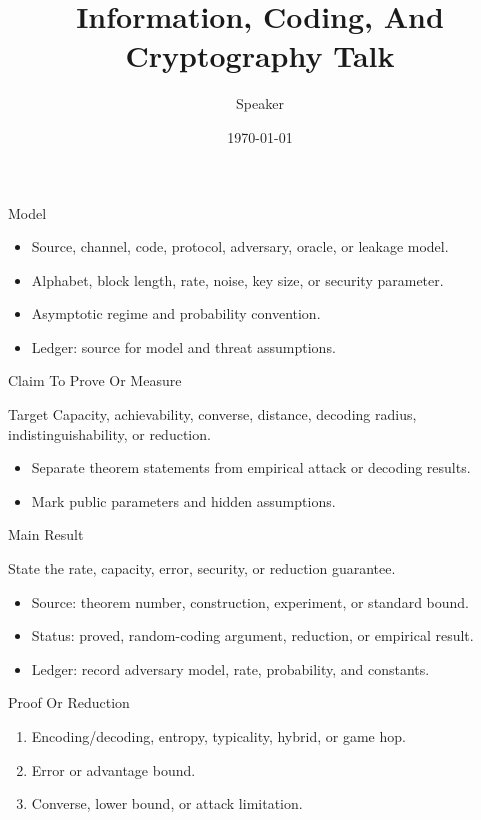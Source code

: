 \documentclass[10pt,aspectratio=169]{beamer}
\title{Information, Coding, And Cryptography Talk}
\author{Speaker}
\date{\today}
\begin{document}
\begin{frame}\titlepage\end{frame}

\begin{frame}{Model}
  \begin{itemize}
    \item Source, channel, code, protocol, adversary, oracle, or leakage model.
    \item Alphabet, block length, rate, noise, key size, or security parameter.
    \item Asymptotic regime and probability convention.
    \item Ledger: source for model and threat assumptions.
  \end{itemize}
\end{frame}

\begin{frame}{Claim To Prove Or Measure}
  \begin{block}{Target}
    Capacity, achievability, converse, distance, decoding radius, indistinguishability, or reduction.
  \end{block}
  \begin{itemize}
    \item Separate theorem statements from empirical attack or decoding results.
    \item Mark public parameters and hidden assumptions.
  \end{itemize}
\end{frame}

\begin{frame}{Main Result}
  \begin{theorem}
    State the rate, capacity, error, security, or reduction guarantee.
  \end{theorem}
  \begin{itemize}
    \item Source: theorem number, construction, experiment, or standard bound.
    \item Status: proved, random-coding argument, reduction, or empirical result.
    \item Ledger: record adversary model, rate, probability, and constants.
  \end{itemize}
\end{frame}

\begin{frame}{Proof Or Reduction}
  \begin{enumerate}
    \item Encoding/decoding, entropy, typicality, hybrid, or game hop.
    \item Error or advantage bound.
    \item Converse, lower bound, or attack limitation.
  \end{enumerate}
\end{frame}
\end{document}
